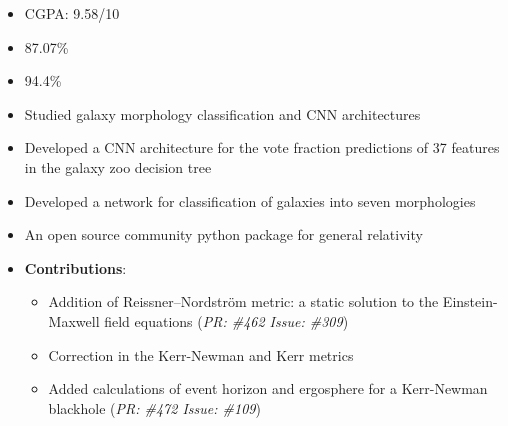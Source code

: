 \documentclass[10pt,a4paper,ragged2e,withhyper]{altacv}
\begin{document}
\begin{paracol}{2}


\switchcolumn

\begin{itemize}
    \item CGPA: 9.58/10
\end{itemize}

\begin{itemize}
    \item 87.07\%
\end{itemize}

\begin{itemize}
    \item 94.4\%
\end{itemize}

\begin{itemize}
    \item Studied galaxy morphology classification and CNN architectures
    \item Developed a CNN architecture for the vote fraction predictions of 37 features in the galaxy zoo decision tree
    \item Developed a network for classification of galaxies into seven morphologies
\end{itemize}
\begin{itemize}
    \item An open source community python package for general relativity
    \item \textbf{Contributions}:
    \begin{itemize}
        \item Addition of  Reissner–Nordström metric: a static solution to the Einstein-Maxwell field equations (\textit{PR: \#462 Issue: \#309})
        \item Correction in the Kerr-Newman and Kerr metrics
        \item Added calculations of event horizon and ergosphere for a Kerr-Newman blackhole (\textit{PR: \#472 Issue: \#109})
    \end{itemize}
\end{itemize}
\nocite{*}
\printbibliography[heading=pubtype,title={\printinfo{\faFile*[regular]}{Journal Articles}}, type=misc]
\end{paracol}
\end{document}
